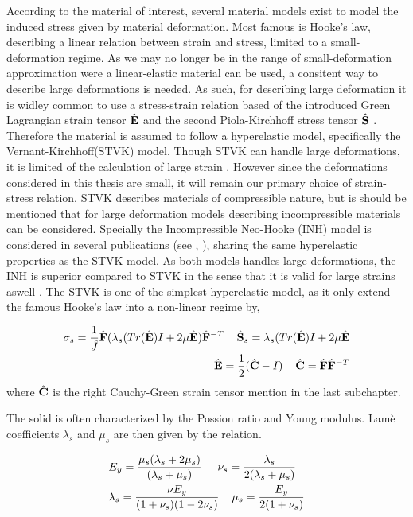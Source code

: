 According to the material of interest, several material models exist to model the induced stress given by material deformation. Most famous is Hooke's law, describing a linear relation between strain and stress, limited to a small-deformation regime. As we may no longer be in the range of small-deformation approximation were a linear-elastic material can be used, a consitent way to describe large deformations is needed. As such, for describing large deformation it is widley common to use a stress-strain relation based of the introduced Green Lagrangian strain tensor $\hat{\mathbf{E}}$ and the second Piola-Kirchhoff stress tensor $\hat{\mathbf{S}}$ \cite{Razzaq2010}. Therefore the material is assumed to follow a hyperelastic model, specifically the Vernant-Kirchhoff(STVK) model. Though STVK can handle large deformations, it is limited of the calculation of large strain \cite{Razzaq2010}. However since the deformations considered in this thesis are small, it will remain our primary choice of strain-stress relation.  STVK describes materials of compressible nature,  but is should be mentioned that for large deformation models describing incompressible materials can be considered. Specially the Incompressible Neo-Hooke (INH) model is considered in several publications (see \cite{Wick2013}, \cite{Richter2010c}), sharing the same hyperelastic properties as the STVK model. As both models handles large deformations, the INH is superior compared to STVK in the sense that it is valid for large strains aswell \cite{Razzaq2010}. \newpage
The STVK is one of the simplest hyperelastic model, as it only extend the famous Hooke's law into a non-linear regime by,

\begin{align*}
\sigma_s = \frac{1}{\hat{J}} \hat{\mathbf{F}}(\lambda_s(Tr(\hat{\mathbf{E}}) I + 2 \mu \hat{\mathbf{E}})\hat{\mathbf{F}}^{-T} \hspace{4mm}
\hat{\mathbf{S}}_s = \lambda_s(Tr(\hat{\mathbf{E}}) I + 2 \mu \hat{\mathbf{E}} \\
\hat{\mathbf{E}} = \frac{1}{2}(\hat{\mathbf{C}} - I ) \hspace{4mm} \hat{\mathbf{C}} = \hat{\mathbf{F}}\hat{\mathbf{F}}^{-T}
\end{align*} 
 where $\hat{\mathbf{C}}$ is the right Cauchy-Green strain tensor mention in the last subchapter. 
  
 The solid is often characterized by the Possion ratio and Young modulus. Lamè coefficients  $\lambda_s$ and $\mu_s$ are then given by the relation.

\begin{align*}
&E_y = \frac{ \mu_s ( \lambda_s + 2 \mu_s) }{ ( \lambda_s + \mu_s ) } 
\hspace{5mm} \nu_s = \frac{\lambda_s}{2(\lambda_s + \mu_s)} \\
&\lambda_s = \frac{\nu E_y}{(1 + \nu_s)(1 - 2\nu_s)} \hspace{4mm} \mu_s = \frac{E_y}{2(1 + \nu_s)} 
\end{align*}

